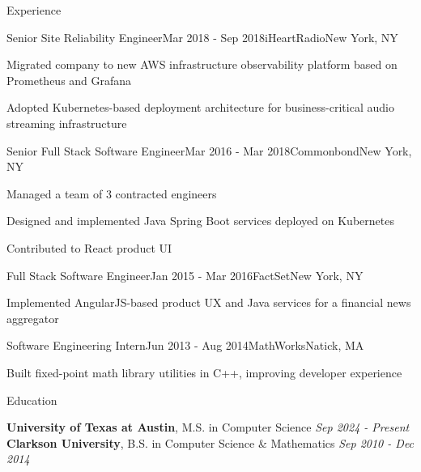 \documentclass[
	10pt, %
]{resume} %
\begin{document}
\begin{rSection}{Experience}

    \begin{rSubsection}{Senior Site Reliability Engineer}{Mar 2018 - Sep 2018}{iHeartRadio}{New York, NY}
        \item Migrated company to new AWS infrastructure observability platform based on Prometheus and Grafana
        \item Adopted Kubernetes-based deployment architecture for business-critical audio streaming infrastructure
    \end{rSubsection}


    \begin{rSubsection}{Senior Full Stack Software Engineer}{Mar 2016 - Mar 2018}{Commonbond}{New York, NY}
        \item Managed a team of 3 contracted engineers
        \item Designed and implemented Java Spring Boot services deployed on Kubernetes
        \item Contributed to React product UI
    \end{rSubsection}
    

    \begin{rSubsection}{Full Stack Software Engineer}{Jan 2015 - Mar 2016}{FactSet}{New York, NY}
        \item Implemented AngularJS-based product UX and Java services for a financial news aggregator
    \end{rSubsection}
    
    \begin{rSubsection}{Software Engineering Intern}{Jun 2013 - Aug 2014}{MathWorks}{Natick, MA}
        \item Built fixed-point math library utilities in C++, improving developer experience
    \end{rSubsection}

\end{rSection}


\begin{rSection}{Education}

    \textbf{University of Texas at Austin}, M.S. in Computer Science \hfill \textit{Sep 2024 - Present} \\ 

    \textbf{Clarkson University}, B.S. in Computer Science \& Mathematics \hfill \textit{Sep 2010 - Dec 2014} \\
	
\end{rSection}
\end{document}
